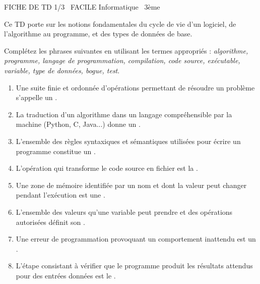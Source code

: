 \documentclass[11pt]{article}
\begin{document}
\begin{tcolorbox}[enhanced,colback=popink,colframe=popink,arc=10pt,boxrule=0pt,left=12pt,right=12pt,top=9pt,bottom=9pt]
{\color{white}\popxbold\small FICHE DE TD 1/3 \textbullet\ FACILE \hfill Informatique \textbullet\ 3ème\par}
\end{tcolorbox}
\vspace{4pt}
Ce TD porte sur les notions fondamentales du cycle de vie d'un logiciel, de l'algorithme au programme, et des types de données de base.

\begin{exercice}
Complétez les phrases suivantes en utilisant les termes appropriés : \textit{algorithme, programme, langage de programmation, compilation, code source, exécutable, variable, type de données, bogue, test}.
\begin{enumerate}
    \item Une suite finie et ordonnée d'opérations permettant de résoudre un problème s'appelle un \dotfill.
    \item La traduction d'un algorithme dans un langage compréhensible par la machine (Python, C, Java...) donne un \dotfill.
    \item L'ensemble des règles syntaxiques et sémantiques utilisées pour écrire un programme constitue un \dotfill.
    \item L'opération qui transforme le code source en fichier \dotfill est la \dotfill.
    \item Une zone de mémoire identifiée par un nom et dont la valeur peut changer pendant l'exécution est une \dotfill.
    \item L'ensemble des valeurs qu'une variable peut prendre et des opérations autorisées définit son \dotfill.
    \item Une erreur de programmation provoquant un comportement inattendu est un \dotfill.
    \item L'étape consistant à vérifier que le programme produit les résultats attendus pour des entrées données est le \dotfill.
\end{enumerate}
\end{exercice}
\end{document}
